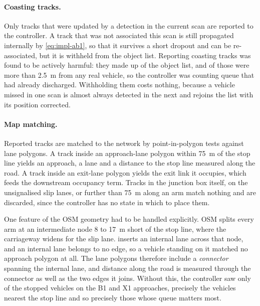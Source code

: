 \paragraph{Coasting tracks.} Only tracks that were updated by a detection in the current scan are reported to
the controller. A track that was not associated this scan is still propagated internally by
\cref{eq:impl-ab1}, so that it survives a short dropout and can be re-associated, but it is withheld from the
object list. Reporting coasting tracks was found to be actively harmful: they made up  of the object
list, and  of those were more than 2.5~m from any real vehicle, so the controller was counting
queue that had already discharged. Withholding them costs nothing, because a vehicle missed in one scan is
almost always detected in the next and rejoins the list with its position corrected.

\paragraph{Map matching.} Reported tracks are matched to the network by point-in-polygon tests against lane
polygons. A track inside an approach-lane polygon within 75~m of the stop line yields an approach, a lane and
a distance to the stop line measured along the road. A track inside an exit-lane polygon yields the exit link
it occupies, which feeds the downstream occupancy term. Tracks in the junction box itself, on the unsignalised
slip lanes, or further than 75~m along an arm match nothing and are discarded, since the controller has no
state in which to place them.

One feature of the OSM geometry had to be handled explicitly. OSM splits every arm at an intermediate node 8
to 17~m short of the stop line, where the carriageway widens for the slip lane. \sumo{} inserts an internal
lane across that node, and an internal lane belongs to no edge, so a vehicle standing on it matched no
approach polygon at all. The lane polygons therefore include a \emph{connector} spanning the internal lane,
and distance along the road is measured through the connector as well as the two edges it joins. Without this,
the controller saw only  of the stopped vehicles on the B1 and X1 approaches, precisely the
vehicles nearest the stop line and so precisely those whose queue matters most.

